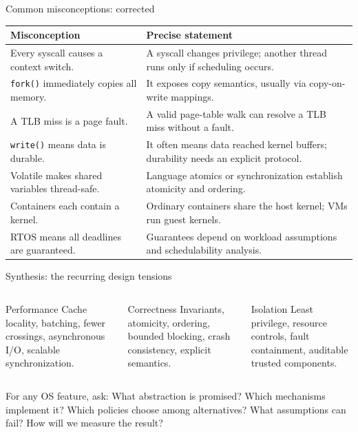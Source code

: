 \documentclass[aspectratio=169,11pt]{beamer}
\newcommand{\code}[1]{\texttt{#1}}
\begin{document}
\begin{frame}{Common misconceptions: corrected}
  \small
  \begin{tabularx}{\textwidth}{@{}X@{\quad$\Rightarrow$\quad}X@{}}
    \toprule
    \textbf{Misconception} & \textbf{Precise statement} \\
    \midrule
    Every syscall causes a context switch. & A syscall changes privilege; another thread runs only if scheduling occurs. \\
    \code{fork()} immediately copies all memory. & It exposes copy semantics, usually via copy-on-write mappings. \\
    A TLB miss is a page fault. & A valid page-table walk can resolve a TLB miss without a fault. \\
    \code{write()} means data is durable. & It often means data reached kernel buffers; durability needs an explicit protocol. \\
    Volatile makes shared variables thread-safe. & Language atomics or synchronization establish atomicity and ordering. \\
    Containers each contain a kernel. & Ordinary containers share the host kernel; VMs run guest kernels. \\
    RTOS means all deadlines are guaranteed. & Guarantees depend on workload assumptions and schedulability analysis. \\
    \bottomrule
  \end{tabularx}
\end{frame}

\begin{frame}{Synthesis: the recurring design tensions}
  \begin{columns}[T,onlytextwidth]
      \begin{block}{Performance}
        Cache locality, batching, fewer crossings, asynchronous I/O, scalable synchronization.
      \end{block}
      \begin{block}{Correctness}
        Invariants, atomicity, ordering, bounded blocking, crash consistency, explicit semantics.
      \end{block}
      \begin{block}{Isolation}
        Least privilege, resource controls, fault containment, auditable trusted components.
      \end{block}
  \end{columns}
  \vspace{0.5em}
  \begin{tcolorbox}[title=Transferable method,colback=osgreen!5,colframe=osgreen!65]
    For any OS feature, ask: What abstraction is promised? Which mechanisms implement it? Which policies choose among alternatives? What assumptions can fail? How will we measure the result?
  \end{tcolorbox}
\end{frame}
\end{document}

